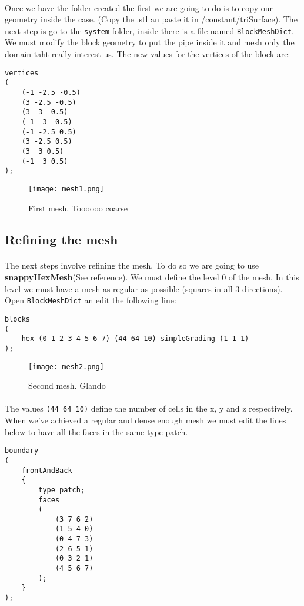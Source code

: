 \paragraph{}Once we have the folder created the first we are going to do is to copy our geometry inside the case. (Copy the .stl an paste it in /constant/triSurface). The next step is  go to the  \texttt{system} folder, inside there is a file named \texttt{BlockMeshDict}. We must modify the block geometry to put the pipe inside it and mesh only the domain taht really interest us. The new values for the vertices of the block are:
\begin{center}
\begin{lstlisting}
vertices
(
    (-1 -2.5 -0.5)
    (3 -2.5 -0.5)
    (3  3 -0.5)
    (-1  3 -0.5)
    (-1 -2.5 0.5)
    (3 -2.5 0.5)
    (3  3 0.5)
    (-1  3 0.5)
);
\end{lstlisting}
\end{center}
\begin{figure}[h!]
\centering
\texttt{[image: mesh1.png]}
\caption{First mesh. Toooooo coarse}
\end{figure}

\subsection{Refining the mesh}
\paragraph{}The next steps involve refining the mesh. To do so we are going to use \textbf{snappyHexMesh}(See reference). We must define the level 0 of the mesh. In this level we must have a mesh as regular as possible (squares in all 3 directions). Open \texttt{BlockMeshDict} an edit the following line:
\begin{center}
\begin{lstlisting}
blocks
(
    hex (0 1 2 3 4 5 6 7) (44 64 10) simpleGrading (1 1 1)
);
\end{lstlisting}
\end{center}
\begin{figure}[h!]
\centering
\texttt{[image: mesh2.png]}
\caption{Second mesh. Glando}
\end{figure}
\paragraph{}The values \lstinline!(44 64 10)! define the number of cells in the x, y and z respectively. When we've achieved a regular and dense enough mesh we must edit the lines below to have all the faces in the same type patch.
\begin{center}
\begin{lstlisting}
boundary
(
    frontAndBack
    {
        type patch;
        faces
        (
            (3 7 6 2)
            (1 5 4 0)
            (0 4 7 3)
            (2 6 5 1)
            (0 3 2 1)
            (4 5 6 7)
        );
    }
);
\end{lstlisting}
\end{center}
